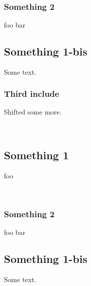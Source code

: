 \label{container-page-test+u+package+++ml-module-Include+u+sections-val-foo}\\
\subsubsection{Something 2\label{something-2}}%
\label{container-page-test+u+package+++ml-module-Include+u+sections-val-bar}\begin{ocamlindent}foo bar\end{ocamlindent}%
\medbreak
\subsection{Something 1-bis\label{something-1-bis}}%
Some text.

\subsubsection{Third include\label{third-include}}%
Shifted some more.

 \hyperref[container-page-test+u+package+++ml-module-Include+u+sections-module-type-Something]{}\label{container-page-test+u+package+++ml-module-Include+u+sections-val-something}\\
\subsection{Something 1\label{something-1}}%
foo

\label{container-page-test+u+package+++ml-module-Include+u+sections-val-foo}\\
\subsubsection{Something 2\label{something-2}}%
\label{container-page-test+u+package+++ml-module-Include+u+sections-val-bar}\begin{ocamlindent}foo bar\end{ocamlindent}%
\medbreak
\subsection{Something 1-bis\label{something-1-bis}}%
Some text.

